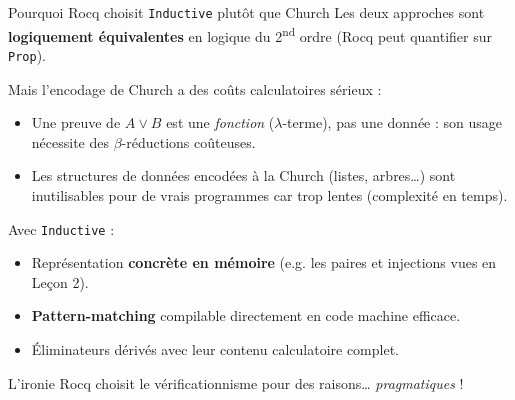 \documentclass[aspectratio=169]{beamer}
\begin{document}
\begin{frame}{Pourquoi Rocq choisit \texttt{Inductive} plutôt que Church}
  Les deux approches sont \textbf{logiquement équivalentes} en logique du 2\textsuperscript{nd}
  ordre (Rocq peut quantifier sur \texttt{Prop}).

  \medskip
  Mais l'encodage de Church a des coûts calculatoires sérieux :
  \begin{itemize}
    \item Une preuve de $A \vee B$ est une \emph{fonction} ($\lambda$-terme), pas une donnée :
      son usage nécessite des $\beta$-réductions coûteuses.
    \item Les structures de données encodées à la Church (listes, arbres…) sont
      inutilisables pour de vrais programmes car trop lentes (complexité en temps).
  \end{itemize}
  \pause
  Avec \texttt{Inductive} :
  \begin{itemize}
    \item Représentation \textbf{concrète en mémoire} (e.g. les paires et injections vues
      en Leçon 2).
    \item \textbf{Pattern-matching} compilable directement en code machine efficace.
    \item Éliminateurs dérivés avec leur contenu calculatoire complet.
  \end{itemize}
  \pause
  \begin{alertblock}{L'ironie}
    Rocq choisit le vérificationnisme pour des raisons\ldots{} \emph{pragmatiques} !
  \end{alertblock}
\end{frame}
\end{document}
